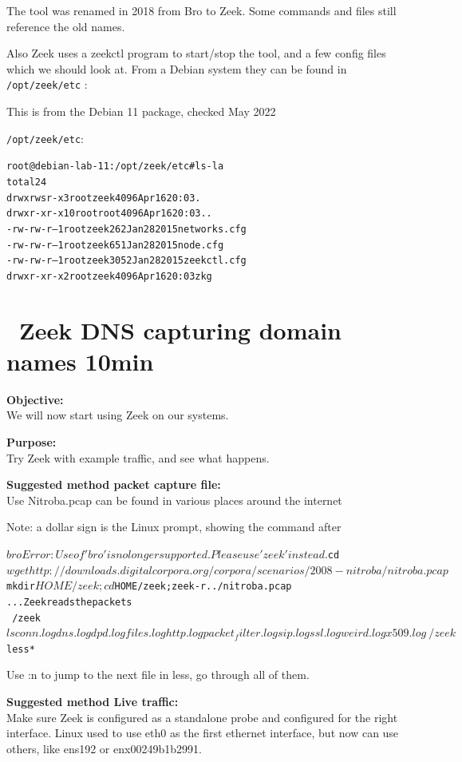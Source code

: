 \documentclass[a4paper,11pt,notitlepage]{report}
\begin{document}
The tool was renamed in 2018 from Bro to Zeek. Some commands and files still reference the old names.

Also Zeek uses a zeekctl program to start/stop the tool, and a few config files which we should look at. From a Debian system they can be found in \verb+/opt/zeek/etc+ :

This is from the Debian 11 package, checked May 2022

\verb+/opt/zeek/etc+:
\begin{alltt}
root@debian-lab-11:/opt/zeek/etc# ls -la
total 24
drwxrwsr-x  3 root zeek 4096 Apr 16 20:03 .
drwxr-xr-x 10 root root 4096 Apr 16 20:03 ..
-rw-rw-r--  1 root zeek  262 Jan 28  2015 networks.cfg
-rw-rw-r--  1 root zeek  651 Jan 28  2015 node.cfg
-rw-rw-r--  1 root zeek 3052 Jan 28  2015 zeekctl.cfg
drwxr-xr-x  2 root zeek 4096 Apr 16 20:03 zkg
\end{alltt}

\chapter{\faExclamationTriangle\ Zeek DNS capturing domain names 10min}
\label{ex:zeekdnsbasic}


{\bf Objective:} \\
We will now start using Zeek on our systems.


{\bf Purpose:}\\
Try Zeek with example traffic, and see what happens.


{\bf Suggested method packet capture file:}\\
Use Nitroba.pcap can be found in various places around the internet

Note: a dollar sign is the Linux prompt, showing the command after
\begin{alltt}\small
$ bro
Error: Use of 'bro' is no longer supported. Please use 'zeek' instead.
$ cd
$ wget http://downloads.digitalcorpora.org/corpora/scenarios/2008-nitroba/nitroba.pcap
$ mkdir $HOME/zeek;cd $HOME/zeek; zeek -r ../nitroba.pcap
... Zeek reads the packets
~/zeek$ ls
conn.log  dns.log  dpd.log  files.log  http.log  packet_filter.log
sip.log  ssl.log  weird.log  x509.log
~/zeek$ less *
\end{alltt}

Use :n to jump to the next file in less, go through all of them.


{\bf Suggested method Live traffic:}\\
Make sure Zeek is configured as a standalone probe and configured for the right interface. Linux used to use eth0 as the first ethernet interface, but now can use others, like ens192 or enx00249b1b2991.
\end{document}
